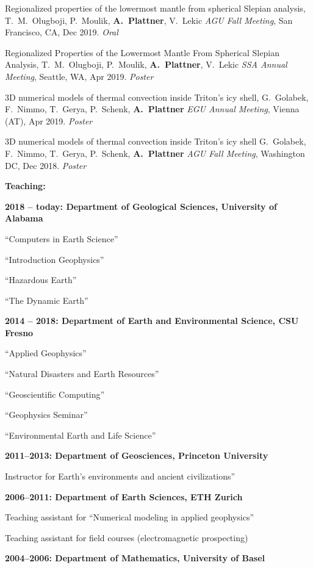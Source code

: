 \documentclass[10pt]{article}
\begin{document}
\spcp
Regionalized properties of the lowermost mantle from spherical Slepian analysis,
T.~M.~Olugboji, P.~Moulik, \textbf{A.~Plattner}, V.~Lekic
\emph{AGU Fall Meeting}, San Francisco, CA, Dec 2019. \emph{Oral}

\spcp Regionalized Properties of the Lowermost Mantle From Spherical
Slepian Analysis, T.~M.~Olugboji, P.~Moulik, \textbf{A.~Plattner},
V.~Lekic \emph{SSA Annual Meeting}, Seattle, WA, Apr
2019. \emph{Poster}

\spcp 3D numerical models of thermal convection inside Triton’s icy
shell, G.~Golabek, F.~Nimmo, T.~Gerya, P.~Schenk, \textbf{A.~Plattner}
\emph{EGU Annual Meeting}, Vienna (AT), Apr 2019. \emph{Poster}

\spcp 3D numerical models of thermal convection inside Triton's icy
shell G.~Golabek, F.~Nimmo, T.~Gerya, P.~Schenk, \textbf{A.~Plattner}
\emph{AGU Fall Meeting}, Washington DC, Dec 2018. \emph{Poster}





\spc
\textbf{\tsize Teaching:}

\spcp
\textbf{2018 -- today: Department of Geological Sciences,
University of Alabama}

``Computers in Earth Science''

``Introduction Geophysics''

``Hazardous Earth''

``The Dynamic Earth''

\spcp
\textbf{2014 -- 2018:  Department of Earth and Environmental Science, CSU Fresno}

``Applied Geophysics''

``Natural Disasters and Earth Resources''

``Geoscientific Computing''

``Geophysics Seminar''

``Environmental Earth and Life Science''


\spcp
\textbf{2011--2013:  Department of Geosciences, Princeton University}

Instructor for Earth's environments and ancient civilizations''

\spcp
\textbf{2006--2011: Department of Earth Sciences, ETH Zurich}

Teaching assistant for ``Numerical modeling in applied geophysics''
     
Teaching assistant for field courses (electromagnetic prospecting)

\spcp
\textbf{2004--2006: Department of Mathematics, University of Basel}
\end{document}
